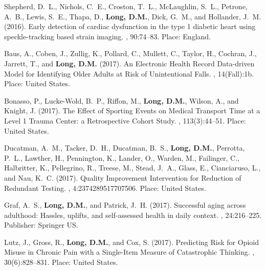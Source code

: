 \begin{thebibliography}{}
Shepherd, D.~L., Nichols, C.~E., Croston, T.~L., McLaughlin, S.~L., Petrone,
  A.~B., Lewis, S.~E., Thapa, D., \textbf{Long, D.M.}, Dick, G.~M., and Hollander,
  J.~M. (2016).
\newblock Early detection of cardiac dysfunction in the type 1 diabetic heart
  using speckle-tracking based strain imaging.
, 90:74--83.
\newblock Place: England.

Baus, A., Coben, J., Zullig, K., Pollard, C., Mullett, C., Taylor, H., Cochran,
  J., Jarrett, T., and \textbf{Long, D.M.} (2017).
\newblock An {Electronic} {Health} {Record} {Data}-driven {Model} for
  {Identifying} {Older} {Adults} at {Risk} of {Unintentional} {Falls}.
, 14(Fall):1b.
\newblock Place: United States.

Bonasso, P., Lucke-Wold, B.~P., Riffon, M., \textbf{Long, D.M.}, Wilson, A., and Knight,
  J. (2017).
\newblock The {Effect} of {Sporting} {Events} on {Medical} {Transport} {Time}
  at a {Level} 1 {Trauma} {Center}: a {Retrospective} {Cohort} {Study}.
, 113(3):44--51.
\newblock Place: United States.

Ducatman, A.~M., Tacker, D.~H., Ducatman, B.~S., \textbf{Long, D.M.}, Perrotta, P.~L.,
  Lawther, H., Pennington, K., Lander, O., Warden, M., Failinger, C.,
  Halbritter, K., Pellegrino, R., Treese, M., Stead, J.~A., Glass, E.,
  Cianciaruso, L., and Nau, K.~C. (2017).
\newblock Quality {Improvement} {Intervention} for {Reduction} of {Redundant}
  {Testing}.
, 4:2374289517707506.
\newblock Place: United States.

Graf, A.~S., \textbf{Long, D.M.}, and Patrick, J.~H. (2017).
\newblock Successful aging across adulthood: {Hassles}, uplifts, and
  self-assessed health in daily context.
, 24:216--225.
\newblock Publisher: Springer US.

Lutz, J., Gross, R., \textbf{Long, D.M.}, and Cox, S. (2017).
\newblock Predicting {Risk} for {Opioid} {Misuse} in {Chronic} {Pain} with a
  {Single}-{Item} {Measure} of {Catastrophic} {Thinking}.
,
  30(6):828--831.
\newblock Place: United States.


\end{thebibliography}
